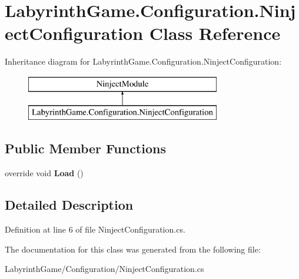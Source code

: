 \hypertarget{class_labyrinth_game_1_1_configuration_1_1_ninject_configuration}{\section{Labyrinth\+Game.\+Configuration.\+Ninject\+Configuration Class Reference}
\label{class_labyrinth_game_1_1_configuration_1_1_ninject_configuration}
}
Inheritance diagram for Labyrinth\+Game.\+Configuration.\+Ninject\+Configuration\+:\begin{figure}[H]
\begin{center}
\leavevmode
\includegraphics[height=2.000000cm]{class_labyrinth_game_1_1_configuration_1_1_ninject_configuration}
\end{center}
\end{figure}
\subsection*{Public Member Functions}
\begin{DoxyCompactItemize}
\item 
\hypertarget{class_labyrinth_game_1_1_configuration_1_1_ninject_configuration_a339c5ad2cc5702f7b8b8d91a7f5cbd48}{override void {\bfseries Load} ()}\label{class_labyrinth_game_1_1_configuration_1_1_ninject_configuration_a339c5ad2cc5702f7b8b8d91a7f5cbd48}

\end{DoxyCompactItemize}


\subsection{Detailed Description}


Definition at line 6 of file Ninject\+Configuration.\+cs.



The documentation for this class was generated from the following file\+:\begin{DoxyCompactItemize}
\item 
Labyrinth\+Game/\+Configuration/Ninject\+Configuration.\+cs\end{DoxyCompactItemize}
